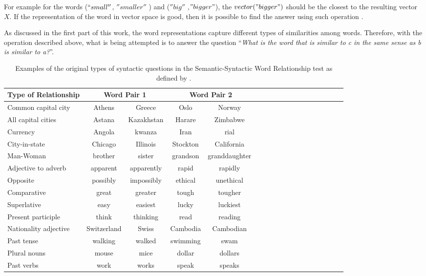  For example  for the words
($``small''$, $''smaller''$ ) and ($''big''$ ,$"bigger"$),
the $vector("bigger")$ should be the closest to the resulting
vector $X$. If the representation of the word in
vector space is good, then it is possible to find the answer using such
operation \cite{DBLP:journals/corr/abs-1301-3781}.

As discussed in the first part of this work, the word representations
capture different types of  similarities among words. Therefore, with the
operation described above,  what is  being
attempted is to answer the question ``\emph{What is the word that is similar to
c in the same sense as b is similar to a?}''. 

\renewcommand{\arraystretch}{1.3}

\begin{table}[h]

  \centering
  \caption{Examples of the original types of syntactic questions in the
    Semantic-Syntactic Word Relationship test as defined 
    by \cite{DBLP:journals/corr/abs-1301-3781}. }
  \label{tab:task_original_en}
  \small
  \begin{tabular}{ |l| |c|*{4}{c| |c| c | c }  }

  \hline           
  Type of Relationship &  \multicolumn{2}{c||}{Word Pair 1} &
  \multicolumn{2}{c|}{Word Pair 2} \\  \hline           
  Common capital city & Athens & Greece & Oslo  & Norway \\ 
  All capital cities  & Astana & Kazakhstan &  Harare & Zimbabwe  \\
  Currency & Angola & kwanza & Iran & rial \\  
  City-in-state  & Chicago & Illinois & Stockton & California \\  
  Man-Woman & brother & sister  & grandson & granddaughter \\  \hline  
  Adjective to adverb & apparent & apparently & rapid & rapidly  \\  
  Opposite & possibly & impossibly & ethical & unethical \\  
  Comparative & great & greater & tough & tougher \\  
  Superlative & easy & easiest & lucky & luckiest \\  
  Present participle & think & thinking & read & reading \\  
  Nationality adjective & Switzerland & Swiss & Cambodia  & Cambodian  \\  
  Past tense & walking & walked & swimming & swam \\ 
  Plural nouns  & mouse & mice & dollar & dollars \\  
  Past verbs & work & works & speak  & speaks  \\  \hline  
\end{tabular}
\end{table}


